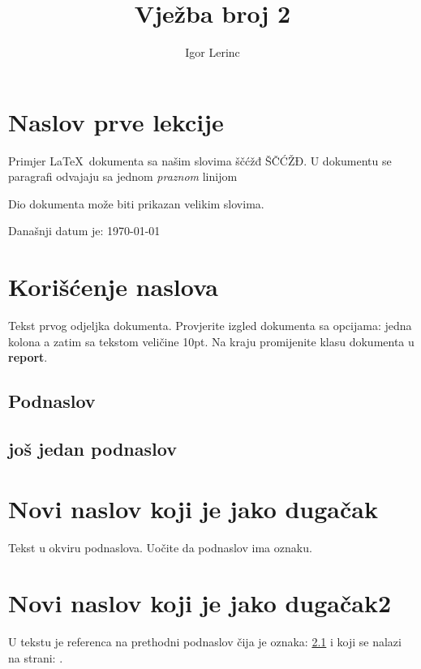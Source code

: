 \documentclass[12pt,a4paper]{article}
\begin{document}
\title{Vježba broj 2}
\author{Igor Lerinc}
\maketitle
\tableofcontents

\section{Naslov prve lekcije}
Primjer \LaTeX\ dokumenta sa našim slovima ščćžđ ŠČĆŽĐ. U dokumentu se
paragrafi odvajaju sa jednom \emph{praznom} linijom

{\Large Dio dokumenta može biti prikazan velikim slovima. \par }
Današnji datum je: \today

\section{Korišćenje naslova}
Tekst prvog odjeljka dokumenta. Provjerite izgled dokumenta sa opcijama:
jedna kolona a zatim sa tekstom veličine 10pt. Na kraju promijenite klasu
dokumenta u \mbox{\textbf{report}}.
\subsection{Podnaslov}\label{abc}
\subsection{još jedan podnaslov}



\section[Novi naslov]{Novi naslov koji je jako dugačak}
 Tekst u okviru podnaslova. Uočite da podnaslov ima oznaku.
\section[Novi naslov]{Novi naslov koji je jako dugačak2}
U tekstu je referenca na prethodni podnaslov čija je oznaka: \ref{abc} i
koji se
nalazi na strani: \pageref{abc}.
 
 
 
 
\end{document}

